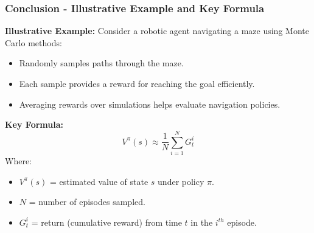 \documentclass[aspectratio=169]{beamer}
\begin{document}
\begin{frame}
    \frametitle{Conclusion - Illustrative Example and Key Formula}

    \textbf{Illustrative Example:} 
    Consider a robotic agent navigating a maze using Monte Carlo methods:
    \begin{itemize}
        \item Randomly samples paths through the maze.
        \item Each sample provides a reward for reaching the goal efficiently.
        \item Averaging rewards over simulations helps evaluate navigation policies.
    \end{itemize}

    \textbf{Key Formula:}
    \begin{equation}
        V^{\pi}(s) \approx \frac{1}{N} \sum_{i=1}^N G_t^i
    \end{equation}
    Where:
    \begin{itemize}
        \item \( V^{\pi}(s) \) = estimated value of state \( s \) under policy \( \pi \).
        \item \( N \) = number of episodes sampled.
        \item \( G_t^i \) = return (cumulative reward) from time \( t \) in the \( i^{th} \) episode.
    \end{itemize}
\end{frame}
\end{document}
